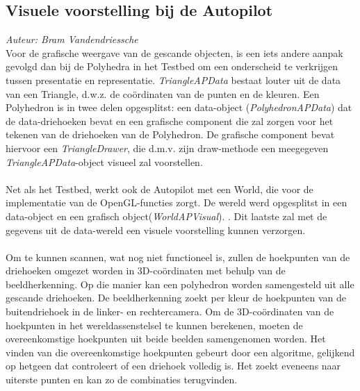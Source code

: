 \subsection{Visuele voorstelling bij de Autopilot}
{\em Auteur: Bram Vandendriessche}\\

\noindent
Voor de grafische weergave van de gescande objecten, is een iets andere aanpak gevolgd dan bij de Polyhedra in het Testbed om een onderscheid te verkrijgen tussen presentatie en representatie. \textit{TriangleAPData} bestaat louter uit de data van een Triangle, d.w.z. de co\"ordinaten van de punten en de kleuren. Een Polyhedron is in twee delen opgesplitst: een data-object (\textit{PolyhedronAPData}) dat de data-driehoeken bevat en een grafische component die zal zorgen voor het tekenen van de driehoeken van de Polyhedron. De grafische component bevat hiervoor een \textit{TriangleDrawer}, die d.m.v. zijn draw-methode een meegegeven \textit{TriangleAPData}-object visueel zal voorstellen.\\
\\
Net als het Testbed, werkt ook de Autopilot met een World, die voor de implementatie van de OpenGL-functies zorgt. De wereld werd opgesplitst in een data-object en een grafisch object(\textit{WorldAPVisual}).
. Dit laatste zal met de gegevens uit de data-wereld een visuele voorstelling kunnen verzorgen.\\
\\
Om te kunnen scannen, wat nog niet functioneel is, zullen de hoekpunten van de driehoeken omgezet worden in 3D-co\"ordinaten met behulp van de beeldherkenning. Op die manier kan een polyhedron worden samengesteld uit alle gescande driehoeken. De beeldherkenning zoekt per kleur de hoekpunten van de buitendriehoek in de linker- en rechtercamera. Om de 3D-co\"ordinaten van de hoekpunten in het wereldassenstelsel te kunnen berekenen, moeten de overeenkomstige hoekpunten uit beide beelden samengenomen worden. Het vinden van die overeenkomstige hoekpunten gebeurt door een algoritme, gelijkend op hetgeen dat controleert of een driehoek volledig is. Het zoekt eveneens naar uiterste punten en kan zo de combinaties terugvinden.  